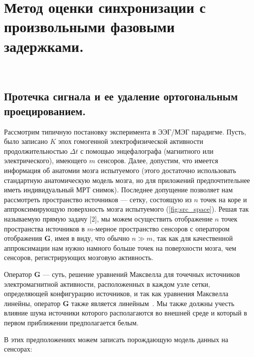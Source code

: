 


\chapter{Метод оценки синхронизации с произвольными фазовыми задержками.}~\label{chapt2}
\section{Протечка сигнала и ее удаление ортогональным проецированием.}\label{sect1_1}


Рассмотрим типичную постановку эксперимента в ЭЭГ/МЭГ парадигме.
Пусть, было записано $K$ эпох гомогенной электрофизической
активности продолжительностью $\Delta t$ с помощью энцефалографа (магнитного или электрического),
имеющего $m$ сенсоров.
Далее, допустим, что имеется информация об анатомии мозга испытуемого (этого достаточно
использовать стандартную анатомическую модель мозга,
но для приложений предпочтительнее иметь индивидуальный МРТ снимок).
Последнее допущение позволяет нам рассмотреть пространство источников --- сетку,
состоящую из $n$ точек на коре и аппроксимирующую поверхность мозга испытуемого (\ref{fig:src_space}).
Решая так называемую прямую задачу [2], мы можем осуществить отображение $n$ точек пространства
источников в $m$-мерное пространство сенсоров с оператором отображения $\mathbf{G}$, имея в виду, что
обычно $n \gg m$, так как для качественной аппроксимации нам нужно намного
больше точек на поверхности мозга, чем сенсоров, регистрирующих мозговую активность.

Оператор $\mathbf{G}$ --- суть, решение уравнений Максвелла для точечных источников электромагнитной активности,
расположенных в каждом узле сетки, определяющей конфигурацию источников,
и так как уравнения Максвелла линейны, оператор $\mathbf{G}$ также является линейным~\cite{Hamalainen1993}.
Мы также должны учесть влияние шума источники которого располагаются во внешней среде
и который в первом приближении предполагается белым.

В этих предположениях можем записать порождающую модель данных на сенсорах:


